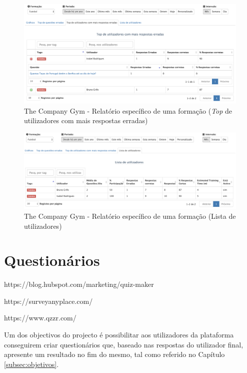 \begin{figure}[ht!]
	\begin{center}
		\includegraphics[width=1\textwidth]{img/tcg/tcg-data-f2.png}
		\caption{The Company Gym - Relatório específico de uma formação (\textit{Top} de utilizadores com mais respostas erradas)}
		\label{fig:tcg-data-f2}
	\end{center}
\end{figure}

\begin{figure}[ht!]
	\begin{center}
		\includegraphics[width=1\textwidth]{img/tcg/tcg-data-f3.png}
		\caption{The Company Gym - Relatório específico de uma formação (Lista de utilizadores)}
		\label{fig:tcg-data-f3}
	\end{center}
\end{figure}

\newpage


\section{Questionários}

https://blog.hubspot.com/marketing/quiz-maker

https://surveyanyplace.com/

https://www.qzzr.com/



Um dos objectivos do projecto é possibilitar aos utilizadores da plataforma conseguirem criar questionários que, baseado nas respostas do utilizador final, apresente um resultado no fim do mesmo, tal como referido no Capítulo \ref{subsec:objetivos}.

